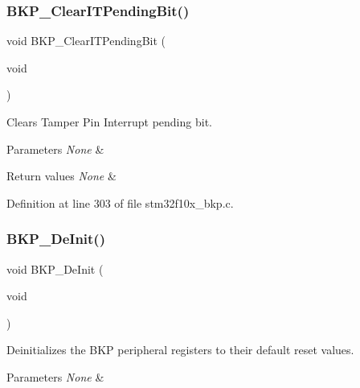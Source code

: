 \subsubsection{\texorpdfstring{B\+K\+P\+\_\+\+Clear\+I\+T\+Pending\+Bit()}{BKP\_ClearITPendingBit()}}
{\footnotesize\ttfamily void B\+K\+P\+\_\+\+Clear\+I\+T\+Pending\+Bit (\begin{DoxyParamCaption}\item[{void}]{ }\end{DoxyParamCaption})}



Clears Tamper Pin Interrupt pending bit. 


\begin{DoxyParams}{Parameters}
{\em None} & \\
\hline
\end{DoxyParams}

\begin{DoxyRetVals}{Return values}
{\em None} & \\
\hline
\end{DoxyRetVals}


Definition at line 303 of file stm32f10x\+\_\+bkp.\+c.

\mbox{\label{group___b_k_p___private___functions_gaabff4d8f5ebf4fd9a840bcc9042ca226}} 
\subsubsection{\texorpdfstring{B\+K\+P\+\_\+\+De\+Init()}{BKP\_DeInit()}}
{\footnotesize\ttfamily void B\+K\+P\+\_\+\+De\+Init (\begin{DoxyParamCaption}\item[{void}]{ }\end{DoxyParamCaption})}



Deinitializes the B\+KP peripheral registers to their default reset values. 


\begin{DoxyParams}{Parameters}
{\em None} & \\
\hline
\end{DoxyParams}

